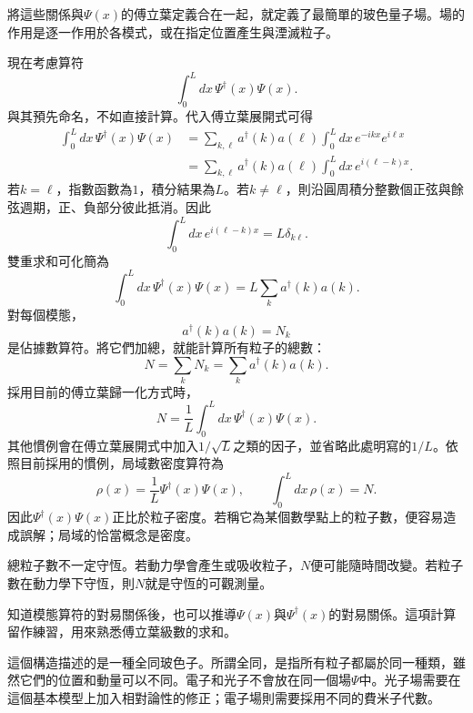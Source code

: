 將這些關係與\(\Psi(x)\)的傅立葉定義合在一起，就定義了最簡單的玻色量子場。場的作用是逐一作用於各模式，或在指定位置產生與湮滅粒子。

現在考慮算符
\begin{equation}
\int_0^L dx\,\Psi^\dagger(x)\Psi(x).
\end{equation}
與其預先命名，不如直接計算。代入傅立葉展開式可得
\begin{align}
\int_0^L dx\,\Psi^\dagger(x)\Psi(x)
&=
\sum_{k,\ell}a^\dagger(k)a(\ell)
\int_0^L dx\,e^{-ikx}e^{i\ell x}
\\
&=
\sum_{k,\ell}a^\dagger(k)a(\ell)
\int_0^L dx\,e^{i(\ell-k)x}.
\end{align}
若\(k=\ell\)，指數函數為\(1\)，積分結果為\(L\)。若\(k\ne\ell\)，則沿圓周積分整數個正弦與餘弦週期，正、負部分彼此抵消。因此
\begin{equation}
\int_0^L dx\,e^{i(\ell-k)x}=L\delta_{k\ell}.
\end{equation}
雙重求和可化簡為
\begin{equation}
\int_0^L dx\,\Psi^\dagger(x)\Psi(x)
=L\sum_k a^\dagger(k)a(k).
\end{equation}
對每個模態，
\begin{equation}
a^\dagger(k)a(k)=N_k
\end{equation}
是佔據數算符。將它們加總，就能計算所有粒子的總數：
\begin{equation}
N=\sum_k N_k=\sum_k a^\dagger(k)a(k).
\end{equation}
採用目前的傅立葉歸一化方式時，
\begin{equation}
N=\frac{1}{L}\int_0^L dx\,
\Psi^\dagger(x)\Psi(x).
\end{equation}
其他慣例會在傅立葉展開式中加入\(1/\sqrt{L}\)之類的因子，並省略此處明寫的\(1/L\)。依照目前採用的慣例，局域數密度算符為
\begin{equation}
\rho(x)=\frac{1}{L}\Psi^\dagger(x)\Psi(x),
\qquad
\int_0^L dx\,\rho(x)=N.
\end{equation}
因此\(\Psi^\dagger(x)\Psi(x)\)正比於粒子密度。若稱它為某個數學點上的粒子數，便容易造成誤解；局域的恰當概念是密度。

總粒子數不一定守恆。若動力學會產生或吸收粒子，\(N\)便可能隨時間改變。若粒子數在動力學下守恆，則\(N\)就是守恆的可觀測量。

知道模態算符的對易關係後，也可以推導\(\Psi(x)\)與\(\Psi^\dagger(x)\)的對易關係。這項計算留作練習，用來熟悉傅立葉級數的求和。

這個構造描述的是一種全同玻色子。所謂全同，是指所有粒子都屬於同一種類，雖然它們的位置和動量可以不同。電子和光子不會放在同一個場\(\Psi\)中。光子場需要在這個基本模型上加入相對論性的修正；電子場則需要採用不同的費米子代數。

